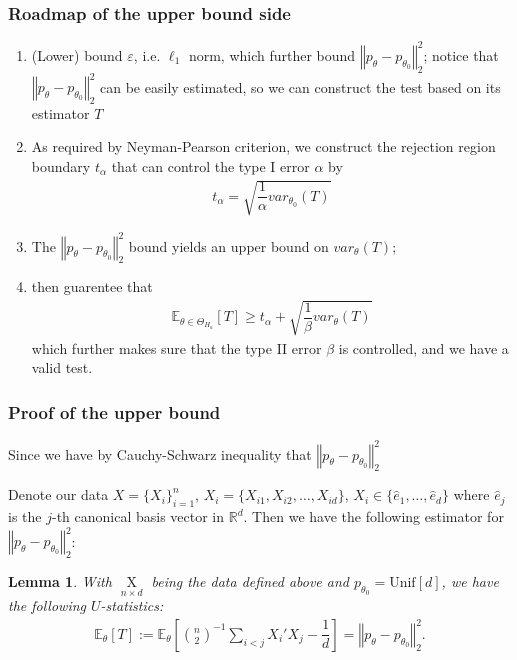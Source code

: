 \documentclass[twoside,12pt]{article}
\newtheorem{lemma}[theorem]{Lemma}
\begin{document}
\subsubsection{Roadmap of the upper bound side}

\begin{enumerate}
   \item (Lower) bound $ \varepsilon  $, i.e. $ \ell_1 $ norm, which further bound  $ \left\Vert p_\theta -p_{\theta _0} \right\Vert _2^2 $; notice that $ \left\Vert p_\theta -p_{\theta _0} \right\Vert _2^2 $ can be easily estimated, so we can construct the test based on its estimator $ T $
   \item As required by Neyman-Pearson criterion, we construct the rejection region boundary $ t_\alpha  $ that can control the type I error $ \alpha  $ by
   \begin{align*}
      t_\alpha = \sqrt{\dfrac{ 1 }{ \alpha  }var_{\theta _0}(T) }
   \end{align*}
   \item The $ \left\Vert p_\theta -p_{\theta _0} \right\Vert _2^2  $ bound yields an upper bound on $ var_\theta (T) $;
   \item then guarentee that
   \begin{align*}
      \mathbb{E}_{\theta \in \Theta _{H_a}}\left[ T \right] \geq t_\alpha + \sqrt{\dfrac{ 1 }{ \beta  }var_{\theta }(T) }  
   \end{align*}
   which further makes sure that the type II error $ \beta  $ is controlled, and we have a valid test.
\end{enumerate}

\subsubsection{Proof of the upper bound}

Since we have by Cauchy-Schwarz inequality that $ \left\Vert p_\theta -p_{\theta _0} \right\Vert _2^2 $



Denote our data $ X = \{X_i\}_{i=1}^n $, $ X_i = \{X_{i1},X_{i2},\ldots,X_{id}\} $, $ X_i \in \{\hat{e}_1,\ldots,\hat{e}_{d}\} $ where $ \hat{e}_{j} $ is the $ j $-th canonical basis vector in $ \mathbb{R}^d $. Then we have the following estimator for $ \left\Vert p_\theta - p_{\theta _0} \right\Vert _2^2 $:

\begin{lemma}
   With $ \mathop{ X }\limits_{n\times d}  $ being the data defined above and $ p_{\theta _0} = \mathrm{ Unif }[d] $, we have the following $ U $-statistics:
   \begin{align*}
      \mathbb{E}_\theta \left[ T \right] := \mathbb{E}_\theta \left[ \binom{n}{2}^{-1}\sum_{i< j}X_i'X_j - \dfrac{ 1 }{ d } \right] = \left\Vert p_\theta -p_{\theta _0} \right\Vert _2^2  .
   \end{align*}
   
\end{lemma}
\end{document}
